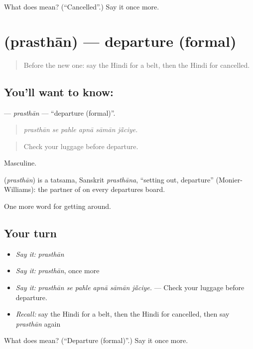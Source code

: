 \begin{tcolorbox}[breakable,colback=teal!4,colframe=teal!35!black,title={Before you move on}]
What does  mean? (\textquotedblleft{}Cancelled\textquotedblright{}.) Say it once more.
\end{tcolorbox}
\section[\texorpdfstring{\hi{प्रस्थान} (prasthān)}{प्रस्थान (prasthān)}]{ (prasthān) — departure (formal)}

\label{lesson:HI-C411-prasthan}



\begin{quote}
Before the new one: say the Hindi for a belt, then the Hindi for cancelled.
\end{quote}

\subsection*{You'll want to know: }
\textbf{} — \emph{prasthān} — \textquotedblleft{}departure (formal)\textquotedblright{}.

\begin{quote}
     
\end{quote}

\begin{quote}
\emph{prasthān se pahle apnā sāmān jā̃ciye.}
\end{quote}

\begin{quote}
Check your luggage before departure.
\end{quote}

Masculine.

\begin{cousinweb}
\textbf{} (\emph{prasthān}) is a tatsama, Sanskrit \emph{prasthāna}, \textquotedblleft{}setting out, departure\textquotedblright{} (Monier-Williams): the partner of  on every departures board.
\end{cousinweb}

\begin{grammarlens}[title={What you've built}]
One more word for getting around.
\end{grammarlens}

\subsection*{Your turn}
\begin{itemize}
\raggedright
  \item \emph{Say it:} \emph{prasthān}
  \item \emph{Say it:} \emph{prasthān}, once more
  \item \emph{Say it:} \emph{prasthān se pahle apnā sāmān jā̃ciye.} — Check your luggage before departure.
  \item \emph{Recall:} say the Hindi for a belt, then the Hindi for cancelled, then say \emph{prasthān} again
\end{itemize}

\begin{tcolorbox}[breakable,colback=teal!4,colframe=teal!35!black,title={Before you move on}]
What does  mean? (\textquotedblleft{}Departure (formal)\textquotedblright{}.) Say it once more.
\end{tcolorbox}

